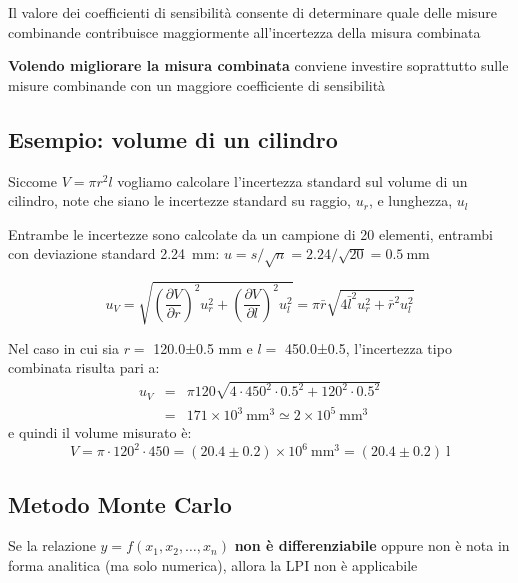 \documentclass[
  letterpaper,
  DIV=11,
  numbers=noendperiod,
  oneside]{scrartcl}
\begin{document}
Il valore dei coefficienti di sensibilità consente di determinare quale
delle misure combinande contribuisce maggiormente all'incertezza della
misura combinata

\textbf{Volendo migliorare la misura combinata} conviene investire
soprattutto sulle misure combinande con un maggiore coefficiente di
sensibilità


\subsection{Esempio: volume di un
cilindro}\label{esempio-volume-di-un-cilindro}

Siccome \(V=\pi r^2l\) vogliamo calcolare l'incertezza standard sul
volume di un cilindro, note che siano le incertezze standard su raggio,
\(u_r\), e lunghezza, \(u_l\)

Entrambe le incertezze sono calcolate da un campione di 20 elementi,
entrambi con deviazione standard 2.24~mm:
\(u=s/\sqrt{n} = 2.24/\sqrt{20} = 0.5~\mathrm{mm}\)

\[
u_V=\sqrt{\left(\frac{\partial V}{\partial r}\right)^2u_r^2 + \left(\frac{\partial V}{\partial l}\right)^2u_l^2 }=
\pi \bar r \sqrt{4\bar l^2 u_r^2+\bar r^2 u_l^2}
\]

Nel caso in cui sia \(r=\) 120.0±0.5 mm e \(l=\) 450.0±0.5, l'incertezza
tipo combinata risulta pari a:
\begin{align}
u_V&=&\pi 120\sqrt{4\cdot 450^2\cdot 0.5^2+120^2\cdot 0.5^2} \\
&=&171\times10^3~\mathrm{ mm^3}\simeq2 \times 10^5~\mathrm{mm^3}
\end{align}
e quindi il volume misurato è: \[
V=\pi \cdot 120^2 \cdot 450 = (20.4\pm0.2)\times 10^6~\mathrm{mm^3}= (20.4\pm0.2)~\mathrm{l}
\]

\subsection{Metodo Monte Carlo}\label{metodo-monte-carlo}

Se la relazione \(y=f(x_1,x_2,\dots, x_n)\) \textbf{non è
differenziabile} oppure non è nota in forma analitica (ma solo
numerica), allora la LPI non è applicabile
\end{document}

